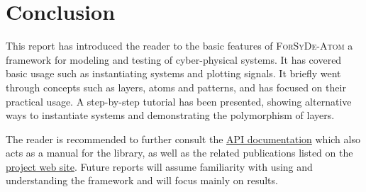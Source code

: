 \section{Conclusion}
\label{sec:getting-started:conclusion}

This report has introduced the reader to the basic features of \textsc{ForSyDe-Atom} a framework for modeling and testing of cyber-physical systems. It has covered basic usage such as instantiating systems and plotting signals. It briefly went through concepts such as layers, atoms and patterns, and has focused on their practical usage. A step-by-step tutorial has been presented, showing alternative ways to instantiate systems and demonstrating the polymorphism of layers.

The reader is recommended to further consult the \href{\contentsurl}{API documentation} which also acts as a manual for the library, as well as the related publications listed on the \href{https://github.com/forsyde/forsyde-atom}{project web site}. Future reports will assume familiarity with using and understanding the framework and will focus mainly on results. 

